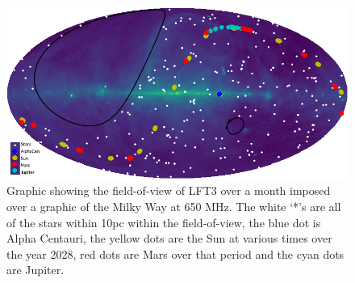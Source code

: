 \begin{figure}
    \centering
    \includegraphics[width=0.95\linewidth]{figures/galaxy_plot.png}
    \caption{Graphic showing the field-of-view of LFT3 over a month imposed over a graphic of the Milky Way at 650 MHz.  The white `*'s are all of the stars within 10pc within the field-of-view, the blue dot is Alpha Centauri, the yellow dots are the Sun at various times over the year 2028, red dots are Mars over that period and the cyan dots are Jupiter.}
    \label{fig:fieldofview}
\end{figure}




